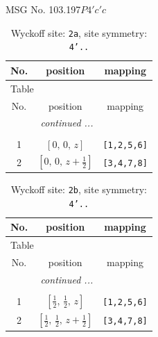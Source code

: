\documentclass[fleqn,8pt]{jsarticle}
\begin{document}
\setcounter{MaxMatrixCols}{32}

\renewcommand{\tablename}{Table~}
\renewcommand{\figurename}{Figure~}
\begin{center}
\LARGE
MSG No. 103.197\quad$P4'c'c$
\end{center}
\renewcommand{\arraystretch}{1.2}
\begin{longtable}{ccc}
\caption{Wyckoff site: {\tt 2a}, site symmetry: {\tt 4'..}}
 \\
 \hline \hline
No. & position & mapping \\ \hline \endfirsthead

\multicolumn{2}{l}{\tablename\ \thetable{}} \\
 \hline \hline
No. & position & mapping \\ \hline \endhead

 \hline \hline
\multicolumn{2}{r}{\footnotesize\it continued ...} \\ \endfoot

 \hline \hline
\multicolumn{2}{r}{} \\ \endlastfoot

1 & $\left[ 0,\, 0,\, z \right]$ & {\tt [1,2,5,6]} \\ \hline
2 & $\left[ 0,\, 0,\, z + \frac{1}{2} \right]$ & {\tt [3,4,7,8]} \\
\end{longtable}
\renewcommand{\arraystretch}{1.2}
\begin{longtable}{ccc}
\caption{Wyckoff site: {\tt 2b}, site symmetry: {\tt 4'..}}
 \\
 \hline \hline
No. & position & mapping \\ \hline \endfirsthead

\multicolumn{2}{l}{\tablename\ \thetable{}} \\
 \hline \hline
No. & position & mapping \\ \hline \endhead

 \hline \hline
\multicolumn{2}{r}{\footnotesize\it continued ...} \\ \endfoot

 \hline \hline
\multicolumn{2}{r}{} \\ \endlastfoot

1 & $\left[ \frac{1}{2},\, \frac{1}{2},\, z \right]$ & {\tt [1,2,5,6]} \\ \hline
2 & $\left[ \frac{1}{2},\, \frac{1}{2},\, z + \frac{1}{2} \right]$ & {\tt [3,4,7,8]} \\
\end{longtable}
\end{document}
